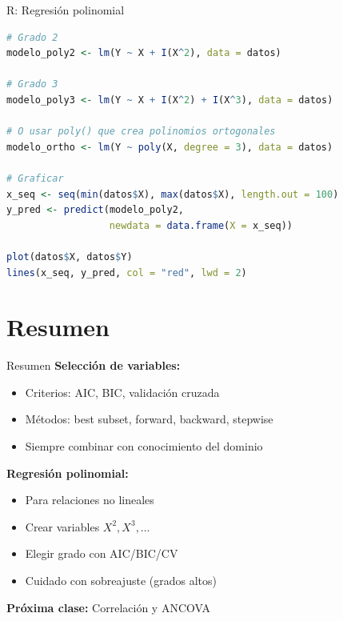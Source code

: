 \documentclass[aspectratio=169]{beamer}
\begin{document}
\begin{frame}[fragile]{R: Regresión polinomial}
\begin{lstlisting}[language=R]
# Grado 2
modelo_poly2 <- lm(Y ~ X + I(X^2), data = datos)

# Grado 3
modelo_poly3 <- lm(Y ~ X + I(X^2) + I(X^3), data = datos)

# O usar poly() que crea polinomios ortogonales
modelo_ortho <- lm(Y ~ poly(X, degree = 3), data = datos)

# Graficar
x_seq <- seq(min(datos$X), max(datos$X), length.out = 100)
y_pred <- predict(modelo_poly2, 
                  newdata = data.frame(X = x_seq))

plot(datos$X, datos$Y)
lines(x_seq, y_pred, col = "red", lwd = 2)
\end{lstlisting}
\end{frame}

\section{Resumen}

\begin{frame}{Resumen}
\textbf{Selección de variables:}
\begin{itemize}
    \item Criterios: AIC, BIC, validación cruzada
    \item Métodos: best subset, forward, backward, stepwise
    \item Siempre combinar con conocimiento del dominio
\end{itemize}

\vspace{0.3cm}
\textbf{Regresión polinomial:}
\begin{itemize}
    \item Para relaciones no lineales
    \item Crear variables $X^2, X^3, \ldots$
    \item Elegir grado con AIC/BIC/CV
    \item Cuidado con sobreajuste (grados altos)
\end{itemize}

\vspace{0.5cm}
\textbf{Próxima clase:} Correlación y ANCOVA
\end{frame}
\end{document}
